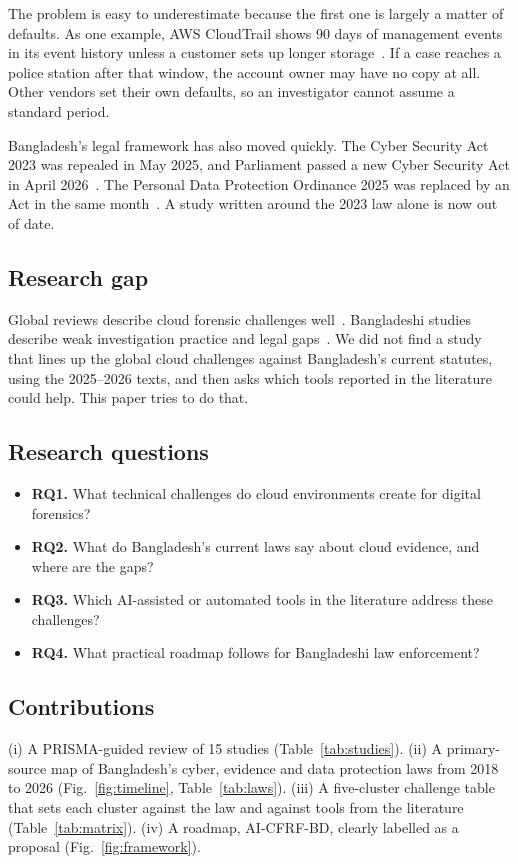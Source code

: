 \documentclass[conference]{IEEEtran}
\begin{document}
The problem is easy to underestimate because the first one is largely a matter of defaults. As one example, AWS CloudTrail shows 90 days of management events in its event history unless a customer sets up longer storage~\cite{aws}. If a case reaches a police station after that window, the account owner may have no copy at all. Other vendors set their own defaults, so an investigator cannot assume a standard period.

Bangladesh's legal framework has also moved quickly. The Cyber Security Act 2023 was repealed in May 2025, and Parliament passed a new Cyber Security Act in April 2026~\cite{cyberact}. The Personal Data Protection Ordinance 2025 was replaced by an Act in the same month~\cite{pdpa}. A study written around the 2023 law alone is now out of date.

\subsection{Research gap}
Global reviews describe cloud forensic challenges well~\cite{alshabibi,alenezi,prakash}. Bangladeshi studies describe weak investigation practice and legal gaps~\cite{ali,uzzal,ahmed,sharmin,rana}. We did not find a study that lines up the global cloud challenges against Bangladesh's current statutes, using the 2025--2026 texts, and then asks which tools reported in the literature could help. This paper tries to do that.

\subsection{Research questions}
\begin{itemize}
\item \textbf{RQ1.} What technical challenges do cloud environments create for digital forensics?
\item \textbf{RQ2.} What do Bangladesh's current laws say about cloud evidence, and where are the gaps?
\item \textbf{RQ3.} Which AI-assisted or automated tools in the literature address these challenges?
\item \textbf{RQ4.} What practical roadmap follows for Bangladeshi law enforcement?
\end{itemize}

\subsection{Contributions}
(i) A PRISMA-guided review of 15 studies (Table~\ref{tab:studies}). (ii) A primary-source map of Bangladesh's cyber, evidence and data protection laws from 2018 to 2026 (Fig.~\ref{fig:timeline}, Table~\ref{tab:laws}). (iii) A five-cluster challenge table that sets each cluster against the law and against tools from the literature (Table~\ref{tab:matrix}). (iv) A roadmap, AI-CFRF-BD, clearly labelled as a proposal (Fig.~\ref{fig:framework}).
\end{document}
